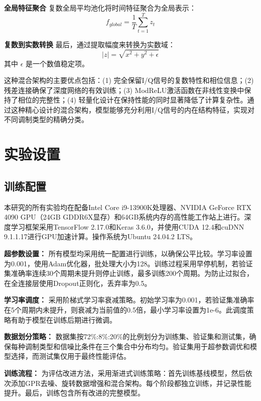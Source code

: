 \documentclass{article}
\begin{document}
\textbf{全局特征聚合} 复数全局平均池化将时间特征聚合为全局表示：
\begin{equation}
f_{global} = \frac{1}{T} \sum_{t=1}^T z_t
\end{equation}

\textbf{复数到实数转换} 最后，通过提取幅度来转换为实数域：
\begin{equation}
|z| = \sqrt{x^2 + y^2 + \epsilon}
\end{equation}
其中 $\epsilon$ 是一个数值稳定项。

这种混合架构的主要优点包括：(1) 完全保留I/Q信号的复数特性和相位信息；(2) 残差连接确保了深度网络的有效训练；(3) ModReLU激活函数在非线性变换中保持了相位的完整性；(4) 轻量化设计在保持性能的同时显著降低了计算复杂性。通过这种精心设计的混合架构，模型能够充分利用I/Q信号的内在结构特征，实现对不同调制类型的精确分类。


\section{实验设置}

\subsection{训练配置}

本研究的所有实验均在配备Intel Core i9-13900K处理器、NVIDIA GeForce RTX 4090 GPU（24GB GDDR6X显存）和64GB系统内存的高性能工作站上进行。深度学习框架采用TensorFlow 2.17.0和Keras 3.6.0，并使用CUDA 12.4和cuDNN 9.1.1.17进行GPU加速计算。操作系统为Ubuntu 24.04.2 LTS。

\textbf{超参数设置：}
所有模型均采用统一配置进行训练，以确保公平比较。学习率设置为0.001，使用Adam优化器，批处理大小为128。训练过程采用早停机制，若验证集准确率连续30个周期未提升则停止训练，最多训练200个周期。为防止过拟合，在全连接层使用Dropout正则化，丢弃率为0.5。

\textbf{学习率调度：}
采用阶梯式学习率衰减策略。初始学习率为0.001，若验证集准确率在5个周期内未提升，则衰减为当前值的0.5倍，最小学习率设置为1e-6。此调度策略有助于模型在训练后期进行微调。

\textbf{数据划分策略：}
数据集按72\%:8\%:20\%的比例划分为训练集、验证集和测试集，确保每种调制类型和信噪比条件在三个集合中分布均匀。验证集用于超参数调优和模型选择，而测试集仅用于最终性能评估。

\textbf{训练流程：}
为评估改进方法，采用渐进式训练策略：首先训练基线模型，然后依次添加GPR去噪、旋转数据增强和混合架构。每个阶段都独立训练，并记录性能提升。最后，训练包含所有改进的完整模型。
\end{document}
